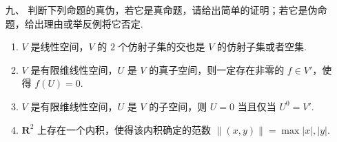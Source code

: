 \begin{enumerate}
    \item[九、]判断下列命题的真伪，若它是真命题，请给出简单的证明；若它是伪命题，给出理由或举反例将它否定.
    \begin{enumerate}[label=(\arabic*)]
        \item $V$ 是线性空间，$V$ 的 $2$ 个仿射子集的交也是 $V$ 的仿射子集或者空集.

        \item $V$ 是有限维线性空间，$U$ 是 $V$ 的真子空间，则一定存在非零的 $f \in V'$，使得 $f(U) = 0$.

        \item $V$ 是有限维线性空间，$U$ 是 $V$ 的子空间，则 $U = {0}$ 当且仅当 $U^{0} = V'$.

        \item $\mathbf{R}^{2}$ 上存在一个内积，使得该内积确定的范数 $\lVert(x, y)\rVert = \max {|x|, |y|}$.
    \end{enumerate}
\end{enumerate}

\clearpage
